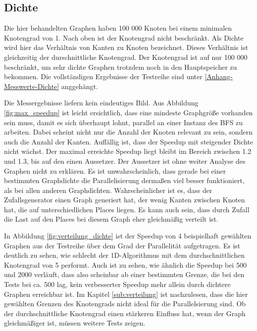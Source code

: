 \subsection{Dichte} %
\label{sub:dichte}
Die hier behandelten Graphen haben 100 000 Knoten bei einem minimalen Knotengrad von 1. Nach oben ist der Knotengrad nicht beschränkt. Als Dichte wird hier das Verhältnis von Kanten zu Knoten bezeichnet. Dieses Verhältnis ist gleichzeitig der durschnittliche Knotengrad. Der Knotengrad ist auf nur 100 000 beschränkt, um sehr dichte Graphen trotzdem noch in den Hauptspeicher zu bekommen. Die vollständigen Ergebnisse der Testreihe sind unter \ref{Anhang-Messwerte-Dichte} anggehängt.

Die Messergebnisse liefern kein eindeutiges Bild. Aus Abbildung \ref{fig:max_speedup} ist leicht ersichtlich, dass eine mindeste Graphgröße vorhanden sein muss, damit es sich überhaupt lohnt, parallel an einer Instanz des BFS zu arbeiten. Dabei scheint nicht nur die Anzahl der Knoten relevant zu sein, sondern auch die Anzahl der Kanten. Auffällig ist, dass der Speedup mit steigender Dichte nicht wächst. Der maximal erreichte Speedup liegt bleibt im Bereich zwischen 1.2 und 1.3, bis auf den einen Aussetzer. Der Aussetzer ist ohne weiter Analyse des Graphen nicht zu erklären. Es ist unwahrscheinlich, dass gerade bei einer bestimmten Graphdichte die Parallelisierung dermaßen viel besser funktioniert, als bei allen anderen Graphdichten. Wahrscheinlicher ist es, dass der Zufallsgenerator einen Graph generiert hat, der wenig Kanten zwischen Knoten hat, die auf unterschiedlichen Places liegen. Es kann auch sein, dass durch Zufall die Last auf den Places bei diesem Graph eher gleichmäßig verteilt ist. 

In Abbildung \ref{fig:verteilung_dichte} ist der Speedup von 4 beispielhaft gewählten Graphen aus der Testreihe über dem Grad der Parallelität aufgetragen. Es ist deutlich zu sehen, wie schlecht der 1D-Algorithmus mit dem durchschnittlichen Knotengrad von 5 performt. Auch ist zu sehen, wie ähnlich die Speedup bei 500 und 2000 verläuft, dass also scheinbar ab einer bestimmten Grenze, die bei den Tests bei ca. 500 lag, kein verbesserter Speedup mehr allein durch dichtere Graphen erreichbar ist. Im Kapitel \ref{sub:verteilung} ist nachzulesen, dass die hier gewählten Grenzen des Knotengrads nicht ideal für die Parallelsierung sind. Ob der durchschnittliche Knotengrad einen stärkeren Einfluss hat, wenn der Graph gleichmäßiger ist, müssen weitere Tests zeigen.

